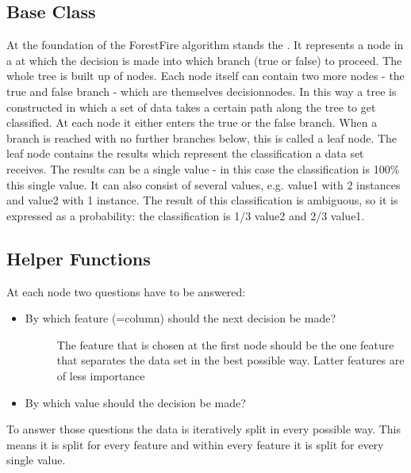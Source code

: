 \documentclass[letterpaper,10pt,english]{sphinxmanual}
\begin{document}
\subsection{Base Class}
\label{\detokenize{DT:base-class}}
At the foundation of the ForestFire algorithm stands the {\hyperref[\detokenize{DT:decisionnode}]{}}.
It represents a node in a {\hyperref[\detokenize{Overview:term-decision-tree}]{}} at which the decision is made into which branch (true or false) to proceed.
The whole tree is built up of nodes.
Each node itself can contain two more nodes - the true and false branch - which are themselves decisionnodes.
In this way a tree is constructed in which a set of data takes a certain path along the tree to get classified.
At each node it either enters the true or the false branch.
When a branch is reached with no further branches below, this is called a leaf node.
The leaf node contains the results which represent the classification a data set receives.
The results can be a single value - in this case the classification is 100\% this single value.
It can also consist of several values, e.g. value1 with 2 instances and value2 with 1 instance.
The result of this classification is ambiguous, so it is expressed as a probability: the classification is 1/3 value2 and 2/3 value1.


\subsection{Helper Functions}
\label{\detokenize{DT:helper-functions}}\label{\detokenize{DT:help}}
At each node two questions have to be answered:
\begin{itemize}
\item {} \begin{description}
\item[{By which feature (=column) should the next decision be made?}] \leavevmode
The feature that is chosen at the first node should be the one feature that separates the data set in the best possible way. Latter features are of less importance

\end{description}

\item {} 
By which value should the decision be made?

\end{itemize}

To answer those questions the data is iteratively split in every possible way.
This means it is split for every feature and within every feature it is split for every single value.
\end{document}

